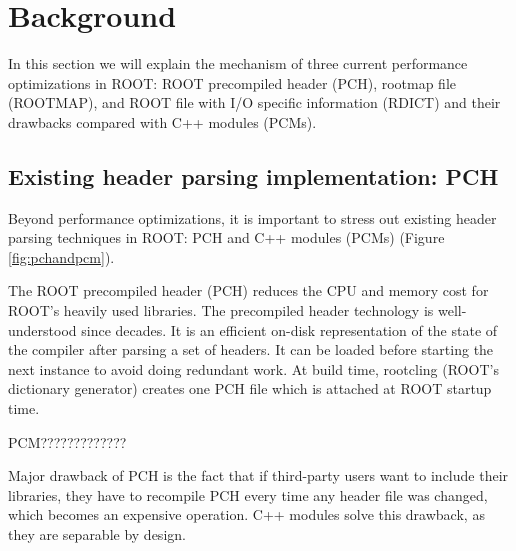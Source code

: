 \documentclass{webofc}
\begin{document}
\section{Background}
\label{background}

In this section we will explain the mechanism of three current performance optimizations in ROOT: ROOT precompiled header (PCH), rootmap file (ROOTMAP), and ROOT file with I/O specific information (RDICT) and their drawbacks compared with C++ modules (PCMs).

\subsection{Existing header parsing implementation: PCH}
\label{pch}

Beyond performance optimizations, it is important to stress out existing header parsing techniques in ROOT: PCH and C++ modules (PCMs) (Figure \ref{fig:pchandpcm}).

The ROOT precompiled header (PCH) reduces the CPU and memory cost for ROOT’s heavily used libraries. The precompiled header technology is well-understood since decades. It is an efficient on-disk representation of the state of the compiler after parsing a set of headers. It can be loaded before starting the next instance to avoid doing redundant work. At build time, rootcling (ROOT’s dictionary generator) creates one PCH file which is attached at ROOT startup time.

PCM?????????????

Major drawback of PCH is the fact that if third-party users want to include their libraries, they have to recompile PCH every time any header file was changed, which becomes an expensive operation. C++ modules solve this drawback, as they are separable by design.
\end{document}
